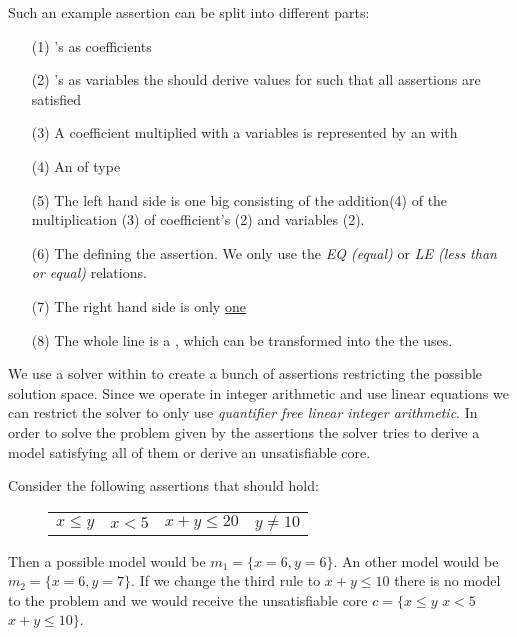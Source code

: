 Such an example assertion can be split into different parts: 
\begin{enumerate}
	\item[(1)] 's as coefficients
	\item[(2)] 's as variables the \solver should derive values for such that all assertions are satisfied
	\item[(3)] A coefficient multiplied with a variables is represented by an  with  
	\item[(4)] An  of type 
	\item[(5)] The left hand side is one big  consisting of the addition(4) of the multiplication (3) of coefficient's (2) and variables (2).
	\item[(6)] The  defining the assertion. We only use the \textit{EQ (equal)} or \textit{LE (less than or equal)} relations.
	\item[(7)] The right hand side is only \underline{one} 
	\item[(8)] The whole line is a , which can be transformed into the  the \solver uses.
\end{enumerate}

We use a solver within \aprove to create a bunch of assertions restricting the possible solution space. Since we operate in integer arithmetic and use linear equations we can restrict the solver to only use \textit{quantifier free linear integer arithmetic}. In order to solve the problem given by the assertions the solver tries to derive a model satisfying all of them or derive an unsatisfiable core. \cite{sat2016}\newline

\begin{example}
	Consider the following assertions that should hold:\newline
	\vspace{-1em}
	\begin{figure}[H]
		\centering
		\begin{tabular}{cccc}
			$x \le y$ &	$x  < 5 $ &	$ x+ y \le 20$ &$y \neq 10$ \\
		\end{tabular}
	\end{figure}
	\vspace{-1em}
	Then a possible model would be $m_1 = \{x=6, y=6\}$. An other model would be $m_2 = \{x=6, y=7\}$. If we change the third rule to $x+y\le 10$ there is no model to the problem and we would receive the unsatisfiable core $c= \{x \le y$ $x  < 5$ $x+ y \le 10 \}$.
\end{example}

